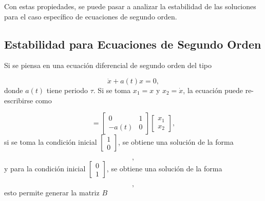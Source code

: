 \documentclass[10pt,a4paper]{report}
\begin{document}
Con estas propiedades, se puede pasar a analizar la estabilidad de las soluciones para el caso específico de ecuaciones de segundo orden.

\subsection{Estabilidad para Ecuaciones de Segundo Orden}\label{EstabilidadSO}

Si se piensa en una ecuación diferencial de segundo orden del tipo

\begin{equation}
\ddot{x} + a(t)x= 0,
\end{equation} donde $a(t)$ tiene periodo $\tau$. Si se toma $x_1 = x$ y $x_2 = \dot{x}$, la ecuación puede re-escribirse como

\begin{equation}
[\begin{array}{c}
\dot{x_1} \\
\dot{x_2}
\end{array}] = [\begin{array}{cc}
0 & 1 \\
-a(t) & 0
\end{array}][\begin{array}{c} 
x_1 \\ 
x_2

\end{array}],
\end{equation} si se toma la condición inicial $[\begin{array}{c} 1 \\ 0 \end{array}]$, se obtiene una solución de la forma

\begin{equation}
[\begin{array}{c}
x_1^1(t) \\
\dot{x_1^1(t)}
\end{array}],
\end{equation} y para la condición inicial $[\begin{array}{c} 0 \\ 1 \end{array}]$, se obtiene una solución de la forma

\begin{equation}
[\begin{array}{c}
x_1^2(t) \\
\dot{x_1^2(t)}
\end{array}],
\end{equation} esto permite generar la matriz $B$
\end{document}
